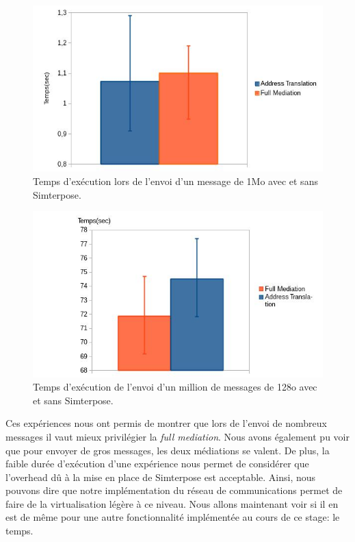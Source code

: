 \begin{figure}
  \centering
    \includegraphics[scale=0.5]{mesures/graph/Bigmsg.jpg}
    \caption{Temps d'exécution lors de l'envoi d'un message de 1Mo avec et sans Simterpose.}
    \label{Network_Big_Mediation}
\end{figure}

\begin{figure}
  \centering
    \includegraphics[scale=0.5]{mesures/graph/Littlemsg.jpg}
    \caption{Temps d'exécution de l'envoi d'un million de messages de 128o avec et sans Simterpose.}
    \label{Network_Little_Mediation}
\end{figure}
  
Ces expériences nous ont permis de montrer que lors de l'envoi de nombreux messages il vaut mieux privilégier la \textit{full mediation}. Nous avons également pu voir que pour envoyer de gros messages, les deux médiations se valent. De plus, la faible durée d'exécution d'une expérience nous permet de considérer que l'overhead dû à la mise en place de Simterpose est acceptable. Ainsi, nous pouvons dire que notre implémentation du réseau de communications permet de faire de la virtualisation légère à ce niveau. Nous allons maintenant voir si il en est de même pour une autre fonctionnalité implémentée au cours de ce stage: le temps.
